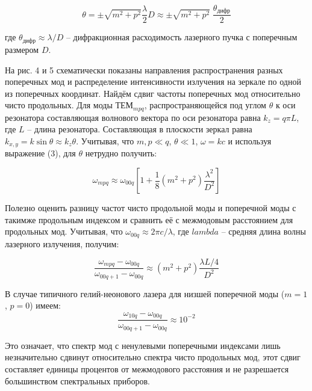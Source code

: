 \documentclass[a4paper,12pt]{article}
\theoremstyle{definition}
\begin{document}
\begin{equation}
	\theta = \pm \sqrt{m^2 + p^2} \dfrac{\lambda}{2} D \approx \pm \sqrt{m^2 + p^2} \; \dfrac{\theta_{\text{дифр}}}{2}
\end{equation} 

где $\theta_{\text{дифр}} \approx \lambda / D$ -- дифракционная расходимость лазерного 
пучка с поперечным размером $D$.

\par На рис. 4 и 5 схематически показаны направления распространения разных поперечных мод
и распределение интенсивности излучения на зеркале по одной из поперечных координат.
Найдём сдвиг частоты поперечных мод относительно чисто продольных. Для моды $ТЕМ_{mpq}$, 
распространяющейся под углом $\theta$ к оси резонатора составляющая волнового вектора по 
оси резонатора равна $k_z = q\pi L$, где $L$ -- длина резонатора. Составляющая в плоскости 
зеркал равна $k_{x,y} = k \sin \theta \approx k_z \theta$. Учитывая, что $m,p \ll q$, 
$\theta \ll 1$, $\omega = kc$ и используя выражение (3), для $\theta$ нетрудно получить:

\begin{equation}
	\omega_{mpq} \approx \omega_{00q}\left[1 + \dfrac{1}{8}(m^2 + p^2)\dfrac{\lambda^2}{D^2}\right]
\end{equation} 

Полезно оценить разницу частот чисто продольной моды и поперечной моды с такимже продольным 
индексом и сравнить её с межмодовым расстоянием для продольных мод. Учитывая, что 
$\omega_{00q} \approx 2\pi c/\lambda$, где $lambda$ -- средняя длина волны лазерного излучения, 
получим:

\begin{equation}
	\dfrac{\omega_{mpq} - \omega_{00q}}{\omega_{00q+1} - \omega_{00q}} \approx (m^2 + p^2)\dfrac{\lambda L/4}{D^2}
\end{equation} 

В случае типичного гелий-неонового лазера для низшей поперечной моды ($m = 1$, $p = 0$) имеем:
\begin{equation}
	\dfrac{\omega_{10q} - \omega_{00q}}{\omega_{00q+1} - \omega_{00q}} \approx 10^{-2}
\end{equation} 

Это означает, что спектр мод с ненулевыми поперечными индексами лишь незначительно сдвинут относительно 
спектра чисто продольных мод, этот сдвиг составляет единицы процентов от межмодового расстояния и 
не разрешается большинством спектральных приборов.
\end{document}
